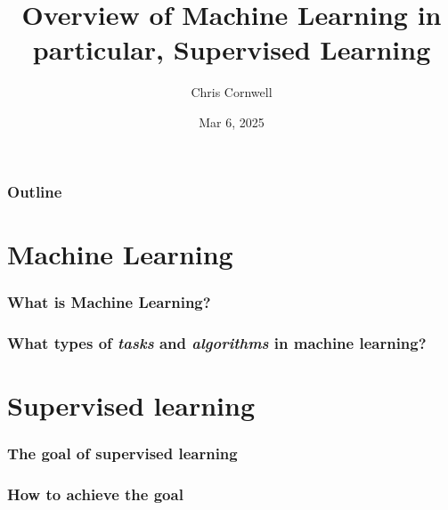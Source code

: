 \documentclass{beamer}
\author{Chris Cornwell}
\date{Mar 6, 2025}
\title{Overview of Machine Learning \newline 
    \footnotesize{in particular, Supervised Learning}}
\theoremstyle{example}
\begin{document}
\begin{frame}
\titlepage
\end{frame}

\begin{frame}
\frametitle{Outline}
\tableofcontents
\end{frame}

\section{Machine Learning}

\begin{frame}
\frametitle{What is Machine Learning?}

\end{frame}

\begin{frame}
\frametitle{What types of \emph{tasks} and \emph{algorithms} in machine learning?}
\end{frame}

\section{Supervised learning}

\begin{frame}
\frametitle{The goal of supervised learning}

\end{frame}

\begin{frame}
\frametitle{How to achieve the goal}

\end{frame}
\end{document}
